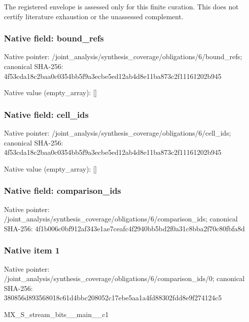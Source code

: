 \documentclass[10pt,a4paper]{article}
\begin{document}
\begingroup\raggedright\sloppy The registered envelope is assessed only for this finite curation. This does not certify literature exhaustion or the unassessed complement.\par\endgroup

\subsubsection{Native field: bound\_\allowbreak{}refs}
Native pointer: /joint\_\allowbreak{}analysis/synthesis\_\allowbreak{}coverage/obligations/6/bound\_\allowbreak{}refs; canonical SHA-256: 4f53cda18c2baa0c0354bb5f9a3ecbe5ed12ab4d8e11ba873c2f11161202b945

Native value (empty\_\allowbreak{}array): []

\subsubsection{Native field: cell\_\allowbreak{}ids}
Native pointer: /joint\_\allowbreak{}analysis/synthesis\_\allowbreak{}coverage/obligations/6/cell\_\allowbreak{}ids; canonical SHA-256: 4f53cda18c2baa0c0354bb5f9a3ecbe5ed12ab4d8e11ba873c2f11161202b945

Native value (empty\_\allowbreak{}array): []

\subsubsection{Native field: comparison\_\allowbreak{}ids}
Native pointer: /joint\_\allowbreak{}analysis/synthesis\_\allowbreak{}coverage/obligations/6/comparison\_\allowbreak{}ids; canonical SHA-256: 4f1b006c0bf912af343e1ae7ceafc4f2940bb5bd2f0a31c8bba2f70c80fbfa8d

\subsubsection{Native item 1}
Native pointer: /joint\_\allowbreak{}analysis/synthesis\_\allowbreak{}coverage/obligations/6/comparison\_\allowbreak{}ids/0; canonical SHA-256: 380856d893568018c61d4bbc208052c17ebe5aa1a4fd88302fdd8e9f274124c5

\begingroup\raggedright\sloppy MX\_\allowbreak{}S\_\allowbreak{}stream\_\allowbreak{}bits\_\allowbreak{}\_\allowbreak{}main\_\allowbreak{}\_\allowbreak{}c1\par\endgroup
\end{document}
